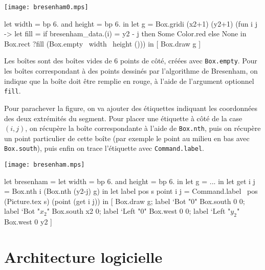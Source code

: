 \documentclass[twoside]{studia-Hermann}
\begin{document}
\medskip
\begin{minipage}{0.32\linewidth}
  \texttt{[image: bresenham0.mps]}
\end{minipage}
\begin{minipage}{0.7\linewidth}
\vspace*{0.8em}
\small\begin{ocaml}
let width = bp 6. 
and height = bp 6. in
let g = Box.gridi (x2+1) (y2+1) 
  (fun i j -> 
    let fill = 
      if bresenham_data.(i) = y2 - j 
      then Some Color.red else None in
    Box.rect ?fill 
      (Box.empty ~width ~height ())) 
in
[ Box.draw g ]
\end{ocaml}
\end{minipage}

\medskip\noindent Les boîtes sont des boîtes vides de 6 points de
côté, créées avec \texttt{Box.empty}. Pour les boîtes correspondant à
des points dessinés par l'algorithme de Bresenham, on indique que la
boîte doit être remplie en rouge, à l'aide de l'argument optionnel
\texttt{fill}. 

Pour parachever la figure, on va ajouter des étiquettes indiquant les
coordonnées des deux extrémités du segment. Pour placer une étiquette
à côté de la case $(i,j)$, on récupère la boîte correspondante à
l'aide de \texttt{Box.nth}, puis on récupère un point particulier de
cette boîte (par exemple le point au milieu en bas avec
\texttt{Box.south}), puis enfin on trace l'étiquette avec
\texttt{Command.label}.

\medskip
\begin{minipage}{0.28\linewidth}
\vspace*{0.8em}
\hspace*{-1.4em}\texttt{[image: bresenham.mps]}
\end{minipage}
\begin{minipage}{0.7\linewidth}\small
\begin{ocaml}
let bresenham = 
  let width = bp 6. 
  and height = bp 6. in
  let g = ... in
  let get i j = 
    Box.nth i (Box.nth (y2-j) g) in
  let label pos s point i j =
    Command.label ~pos (Picture.tex s) 
      (point (get i j)) in
  [ Box.draw g;
    label `Bot "0" Box.south 0 0; 
    label `Bot "$x_2$" Box.south x2 0;
    label `Left "0" Box.west 0 0; 
    label `Left "$y_2$" Box.west 0 y2 ]
\end{ocaml}
\end{minipage}

\section{Architecture logicielle}\label{archi}
\end{document}
